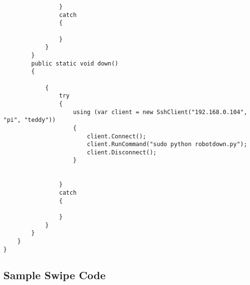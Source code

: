 \begin{lstlisting}
                }
                catch
                {

                }
            }
        }
        public static void down()
        {

            {
                try
                {
                    using (var client = new SshClient("192.168.0.104", "pi", "teddy"))
                    {
                        client.Connect();
                        client.RunCommand("sudo python robotdown.py");
                        client.Disconnect();
                    }


                }
                catch
                {

                }
            }
        }
    }
}
\end{lstlisting}
    
\subsection{Sample Swipe Code}
